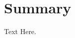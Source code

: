 \documentclass[12pt]{article}
\begin{document}
\maketitle

\tableofcontents

\section{Summary}
\label{sec:summery}

Text Here.

%
%
\end{document}
